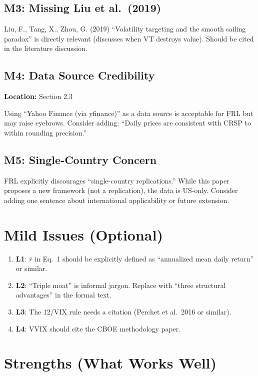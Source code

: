 \documentclass[12pt,a4paper]{article}
\begin{document}
\subsection*{M3: Missing Liu et al.\ (2019)}

Liu, F., Tang, X., Zhou, G. (2019) ``Volatility targeting and the smooth sailing paradox'' is directly relevant (discusses when VT destroys value). Should be cited in the literature discussion.

\subsection*{M4: Data Source Credibility}

\textbf{Location:} Section 2.3

Using ``Yahoo Finance (via yfinance)'' as a data source is acceptable for FRL but may raise eyebrows. Consider adding: ``Daily prices are consistent with CRSP to within rounding precision.''

\subsection*{M5: Single-Country Concern}

FRL explicitly discourages ``single-country replications.'' While this paper proposes a new framework (not a replication), the data is US-only. Consider adding one sentence about international applicability or future extension.

\section*{Mild Issues (Optional)}

\begin{enumerate}
\item \textbf{L1}: $\bar{r}$ in Eq.\ 1 should be explicitly defined as ``annualized mean daily return'' or similar.
\item \textbf{L2}: ``Triple moat'' is informal jargon. Replace with ``three structural advantages'' in the formal text.
\item \textbf{L3}: The 12/VIX rule needs a citation (Perchet et al.\ 2016 or similar).
\item \textbf{L4}: VVIX should cite the CBOE methodology paper.
\end{enumerate}

\section*{Strengths (What Works Well)}
\end{document}
